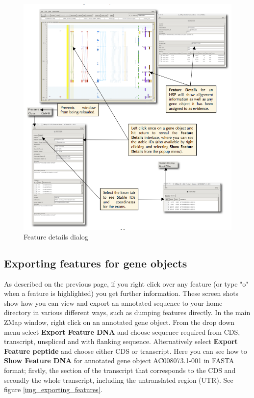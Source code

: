 \documentclass[letterpaper]{article}
\begin{document}
\begin{figure}
\centering
\color[rgb]{0.30980393,0.5058824,0.7411765}
\includegraphics[width=15.231cm]{img_feature_details_dialog.png}
\caption{Feature details dialog}
\label{img_feature_details_dialog}
\end{figure}

\subsection{Exporting features for gene objects}
As described on the previous page, if you right click over any feature (or type "o" when a feature is highlighted) you get further information. These screen shots show how you can view and export an annotated sequence to your home directory in various different ways, such as dumping features directly. In the main ZMap window, right click on an annotated gene object. From the drop down menu select \textbf{Export Feature DNA} and choose sequence required from CDS, transcript, unspliced and with flanking sequence. Alternatively select \textbf{Export Feature peptide} and choose either CDS or transcript. Here you can see how to \textbf{Show Feature DNA} for annotated gene object AC008073.1-001 in FASTA format; firstly, the section of the transcript that corresponds to the CDS and secondly the whole transcript, including the untranslated region (UTR). See figure \ref{img_exporting_features}.
\end{document}
